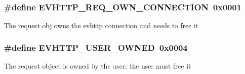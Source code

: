 \subsubsection[{\-E\-V\-H\-T\-T\-P\-\_\-\-R\-E\-Q\-\_\-\-O\-W\-N\-\_\-\-C\-O\-N\-N\-E\-C\-T\-I\-O\-N}]{\setlength{\rightskip}{0pt plus 5cm}\#define {\bf \-E\-V\-H\-T\-T\-P\-\_\-\-R\-E\-Q\-\_\-\-O\-W\-N\-\_\-\-C\-O\-N\-N\-E\-C\-T\-I\-O\-N}~0x0001}\label{http__struct_8h_ac1ed79c48fba93d5455f5672c0f2127b}
\-The request obj owns the evhttp connection and needs to free it 
\subsubsection[{\-E\-V\-H\-T\-T\-P\-\_\-\-U\-S\-E\-R\-\_\-\-O\-W\-N\-E\-D}]{\setlength{\rightskip}{0pt plus 5cm}\#define {\bf \-E\-V\-H\-T\-T\-P\-\_\-\-U\-S\-E\-R\-\_\-\-O\-W\-N\-E\-D}~0x0004}\label{http__struct_8h_a757053e4f471ea984ace48bc682e72cb}
\-The request object is owned by the user; the user must free it 